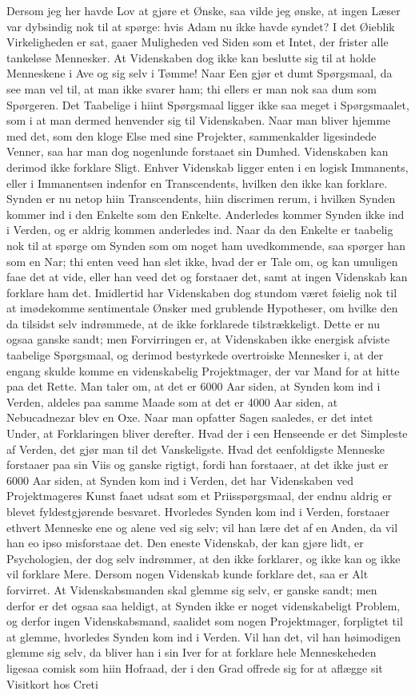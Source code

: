 \documentclass[12pt,a4paper]{article}
\begin{document}
Dersom jeg her havde Lov at gjøre et Ønske, saa vilde jeg ønske, at ingen Læser var dybsindig nok til at spørge: hvis Adam nu ikke havde syndet? I det Øieblik Virkeligheden er sat, gaaer Muligheden ved Siden som et Intet, der frister alle tankeløse Mennesker. At Videnskaben dog ikke kan beslutte sig til at holde Menneskene i Ave og sig selv i Tømme! Naar Een gjør et dumt Spørgsmaal, da see man vel til, at man ikke svarer ham; thi ellers er man nok saa dum som Spørgeren. Det Taabelige i hiint Spørgsmaal ligger ikke saa meget i Spørgsmaalet, som i at man dermed henvender sig til Videnskaben. Naar man bliver hjemme med det, som den kloge Else med sine Projekter, sammenkalder ligesindede Venner, saa har man dog nogenlunde forstaaet sin Dumhed. Videnskaben kan derimod ikke forklare Sligt. Enhver Videnskab ligger enten i en logisk Immanents, eller i Immanentsen indenfor en Transcendents, hvilken den ikke kan forklare. Synden er nu netop hiin Transcendents, hiin discrimen rerum, i hvilken Synden kommer ind i den Enkelte som den Enkelte. Anderledes kommer Synden ikke ind i Verden, og er aldrig kommen anderledes ind. Naar da den Enkelte er taabelig nok til at spørge om Synden som om noget ham uvedkommende, saa spørger han som en Nar; thi enten veed han slet ikke, hvad der er Tale om, og kan umuligen faae det at vide, eller han veed det og forstaaer det, samt at ingen Videnskab kan forklare ham det. Imidlertid har Videnskaben dog stundom været føielig nok til at imødekomme sentimentale Ønsker med grublende Hypotheser, om hvilke den da tilsidst selv indrømmede, at de ikke forklarede tilstrækkeligt. Dette er nu ogsaa ganske sandt; men Forvirringen er, at Videnskaben ikke energisk afviste taabelige Spørgsmaal, og derimod bestyrkede overtroiske Mennesker i, at der engang skulde komme en videnskabelig Projektmager, der var Mand for at hitte paa det Rette. Man taler om, at det er 6000 Aar siden, at Synden kom ind i Verden, aldeles paa samme Maade som at det er 4000 Aar siden, at Nebucadnezar blev en Oxe. Naar man opfatter Sagen saaledes, er det intet Under, at Forklaringen bliver derefter. Hvad der i een Henseende er det Simpleste af Verden, det gjør man til det Vanskeligste. Hvad det eenfoldigste Menneske forstaaer paa sin Viis og ganske rigtigt, fordi han forstaaer, at det ikke just er 6000 Aar siden, at Synden kom ind i Verden, det har Videnskaben ved Projektmageres Kunst faaet udsat som et Priisspørgsmaal, der endnu aldrig er blevet fyldestgjørende besvaret. Hvorledes Synden kom ind i Verden, forstaaer ethvert Menneske ene og alene ved sig selv; vil han lære det af en Anden, da vil han eo ipso misforstaae det. Den eneste Videnskab, der kan gjøre lidt, er Psychologien, der dog selv indrømmer, at den ikke forklarer, og ikke kan og ikke vil forklare Mere. Dersom nogen Videnskab kunde forklare det, saa er Alt forvirret. At Videnskabsmanden skal glemme sig selv, er ganske sandt; men derfor er det ogsaa saa heldigt, at Synden ikke er noget videnskabeligt Problem, og derfor ingen Videnskabsmand, saalidet som nogen Projektmager, forpligtet til at glemme, hvorledes Synden kom ind i Verden. Vil han det, vil han høimodigen glemme sig selv, da bliver han i sin Iver for at forklare hele Menneskeheden ligesaa comisk som hiin Hofraad, der i den Grad offrede sig for at aflægge sit Visitkort hos Creti 
\end{document}

